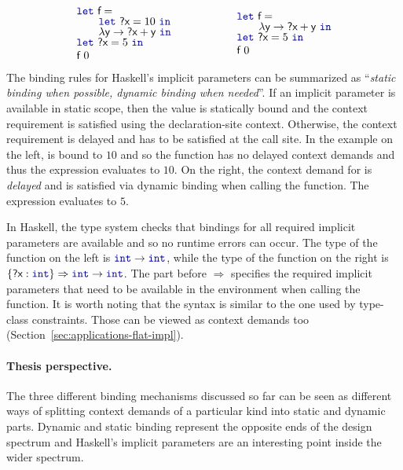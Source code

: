 \begin{equation*}
\begin{array}{l}
\kvd{let}~\ident{f}=\\[-0.25em]
\qquad\kvd{let}~\ident{?x}=10~\kvd{in}\\[-0.25em]
\qquad\lambda \ident{y}\rightarrow \ident{?x}+\ident{y}~\kvd{in}\\[-0.25em]
\kvd{let}~\ident{?x}=5~\kvd{in}\\
\ident{f}~0
\end{array}\hspace{5em}\begin{array}{l}
\kvd{let}~\ident{f}=\\[-0.25em]
\qquad\lambda \ident{y}\rightarrow \ident{?x}+\ident{y}~\kvd{in}\\[-0.25em]
\kvd{let}~\ident{?x}=5~\kvd{in}\\
\ident{f}~0
\end{array}
\end{equation*}
%
The binding rules for Haskell's implicit parameters can be summarized as ``\emph{static binding when possible,
dynamic binding when needed}''. If an implicit parameter is available in static scope, then the value
is statically bound and the context requirement is satisfied using the declaration-site context.
Otherwise, the context requirement is delayed and has to be satisfied at the call site.
In the example on the left,  is bound to $10$ and so the function  has no
delayed context demands and thus the expression evaluates to $10$. On the right,
the context demand for  is \emph{delayed} and is satisfied via dynamic binding when calling
the function. The expression evaluates to $5$.

In Haskell, the type system checks that bindings for all required implicit parameters are
available and so no runtime errors can occur. The type of the function  on the left is
$\kvd{int}\rightarrow\kvd{int}$, while the type of the  function on the right is
$\{\ident{?x}:\kvd{int}\}\Rightarrow\kvd{int}\rightarrow\kvd{int}$.
The part before $\Rightarrow$ specifies the required implicit parameters that need to be available
in the environment when calling the function. It is worth noting that the syntax is similar to the
one used by type-class constraints. Those can be viewed as context demands too
(Section~\ref{sec:applications-flat-impl}).

\paragraph{Thesis perspective.}
The three different binding mechanisms discussed so far can be seen as different ways of splitting
context demands of a particular kind into static and dynamic parts. Dynamic and static binding
represent the opposite ends of the design spectrum and Haskell's implicit parameters are an
interesting point inside the wider spectrum.

